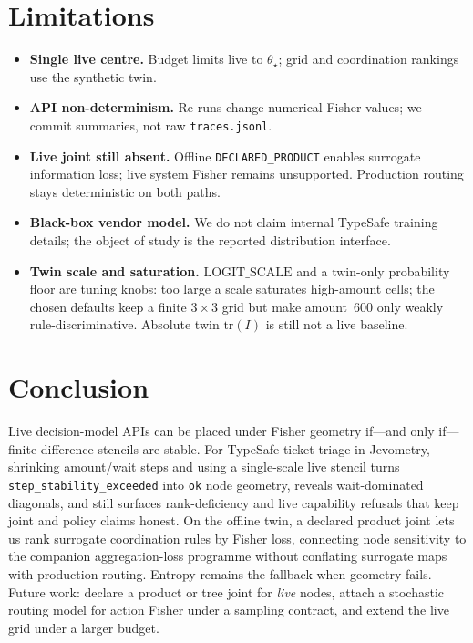 \documentclass[11pt,a4paper]{article}
\begin{document}
\section{Limitations}

\begin{itemize}
  \item \textbf{Single live centre.} Budget limits live to $\theta_\star$;
  grid and coordination rankings use the synthetic twin.
  \item \textbf{API non-determinism.} Re-runs change numerical Fisher values;
  we commit summaries, not raw \texttt{traces.jsonl}.
  \item \textbf{Live joint still absent.} Offline \texttt{DECLARED\_PRODUCT}
  enables surrogate information loss; live system Fisher remains unsupported.
  Production routing stays deterministic on both paths.
  \item \textbf{Black-box vendor model.} We do not claim internal TypeSafe
  training details; the object of study is the reported distribution interface.
  \item \textbf{Twin scale and saturation.} $\mathrm{LOGIT\_SCALE}$ and a
  twin-only probability floor are tuning knobs: too large a scale saturates
  high-amount cells; the chosen defaults keep a finite $3{\times}3$ grid but
  make amount~$600$ only weakly rule-discriminative. Absolute twin
  $\mathrm{tr}(I)$ is still not a live baseline.
\end{itemize}

\section{Conclusion}

Live decision-model APIs can be placed under Fisher geometry if---and
only if---finite-difference stencils are stable. For TypeSafe ticket triage in
Jevometry, shrinking amount/wait steps and using a single-scale live stencil
turns \texttt{step\_stability\_exceeded} into \texttt{ok} node geometry,
reveals wait-dominated diagonals, and still surfaces rank-deficiency and live
capability refusals that keep joint and policy claims honest. On the offline
twin, a declared product joint lets us rank surrogate coordination rules by
Fisher loss, connecting node sensitivity to the companion aggregation-loss
programme without conflating surrogate maps with production routing. Entropy
remains the fallback when geometry fails. Future work: declare a product or
tree joint for \emph{live} nodes, attach a stochastic routing model for action
Fisher under a sampling contract, and extend the live grid under a larger
budget.
\end{document}
